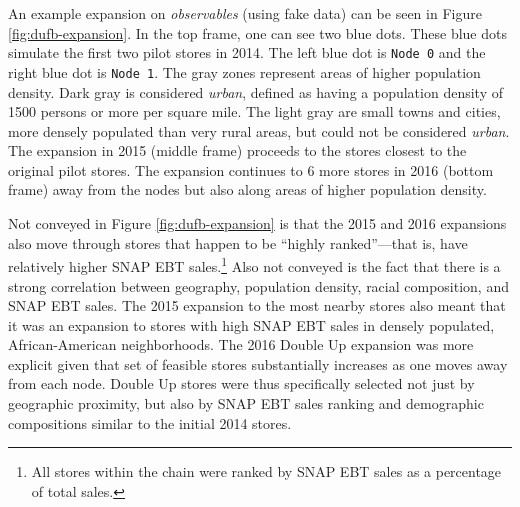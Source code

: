 \documentclass[12pt,letterpaperpaper,]{book}
\begin{document}
An example expansion on \emph{observables} (using fake data) can be seen
in Figure \ref{fig:dufb-expansion}. In the top frame, one can see two
blue dots. These blue dots simulate the first two pilot stores in 2014.
The left blue dot is \texttt{Node\ 0} and the right blue dot is
\texttt{Node\ 1}. The gray zones represent areas of higher population
density. Dark gray is considered \emph{urban}, defined as having a
population density of 1500 persons or more per square mile. The light
gray are small towns and cities, more densely populated than very rural
areas, but could not be considered \emph{urban}. The expansion in 2015
(middle frame) proceeds to the stores closest to the original pilot
stores. The expansion continues to 6 more stores in 2016 (bottom frame)
away from the nodes but also along areas of higher population density.

Not conveyed in Figure \ref{fig:dufb-expansion} is that the 2015 and
2016 expansions also move through stores that happen to be ``highly
ranked''---that is, have relatively higher SNAP EBT sales.\footnote{All
  stores within the chain were ranked by SNAP EBT sales as a percentage
  of total sales.} Also not conveyed is the fact that there is a strong
correlation between geography, population density, racial composition,
and SNAP EBT sales. The 2015 expansion to the most nearby stores also
meant that it was an expansion to stores with high SNAP EBT sales in
densely populated, African-American neighborhoods. The 2016 Double Up
expansion was more explicit given that set of feasible stores
substantially increases as one moves away from each node. Double Up
stores were thus specifically selected not just by geographic proximity,
but also by SNAP EBT sales ranking and demographic compositions similar
to the initial 2014 stores.
\end{document}
